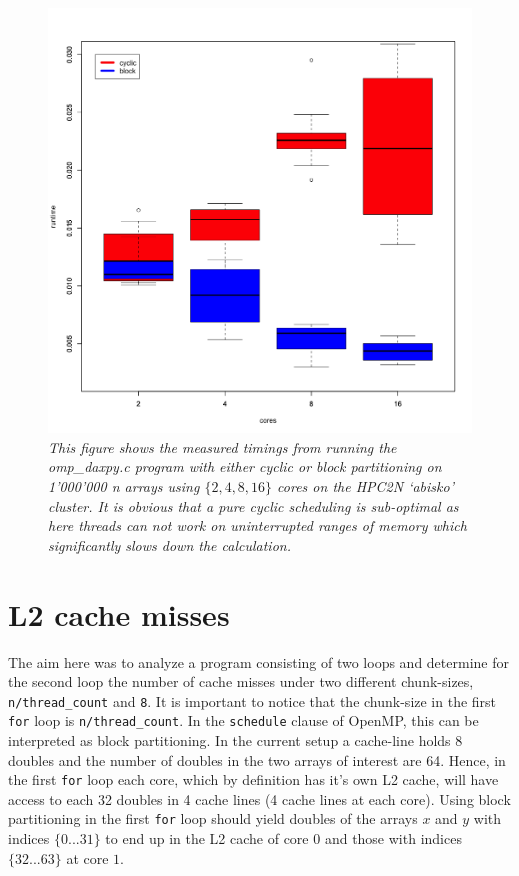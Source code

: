 \documentclass[a4paper,11pt,twoside]{article}
\begin{document}
\begin{figure}
  \centering
  \includegraphics[width=1\textwidth]{daxpy.png}
  \caption{\textit{This figure shows the measured timings from running the omp\_daxpy.c program with either cyclic or block partitioning on 1'000'000 n arrays using $\{2, 4, 8, 16\}$ cores on the HPC2N `abisko' cluster. It is obvious that a pure cyclic scheduling is sub-optimal as here threads can not work on uninterrupted ranges of memory which significantly slows down the calculation.}}
  \label{fig:daxpy}
\end{figure}

\section{L2 cache misses}
The aim here was to analyze a program consisting of two loops and determine for the second loop the number of cache misses under two different chunk-sizes, \verb+n/thread_count+ and \verb+8+. It is important to notice that the chunk-size in the first \verb+for+ loop is \verb+n/thread_count+. In the \verb+schedule+ clause of OpenMP, this can be interpreted as block partitioning. In the current setup a cache-line holds 8 doubles and the number of doubles in the two arrays of interest are 64. Hence, in the first \verb+for+ loop each core, which by definition has it's own L2 cache, will have access to each 32 doubles in 4 cache lines (4 cache lines at each core). Using block partitioning in the first \verb+for+ loop should yield doubles of the arrays $x$ and $y$ with indices $\{0...31\}$ to end up in the L2 cache of core $0$ and those with indices $\{32...63\}$ at core $1$.
\end{document}
